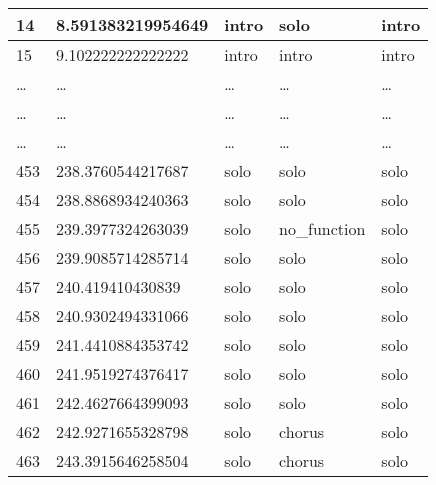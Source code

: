 \begin{table}[t]
\begin{tabular}{|l|l|l|l|l|}
    14            & 8.591383219954649  & intro               & solo                     & intro                   \\ \hline
    15            & 9.102222222222222  & intro               & intro                    & intro                   \\ \hline
    \dots         & \dots              & \dots               & \dots                    & \dots                   \\ \hline
    \dots         & \dots              & \dots               & \dots                    & \dots                   \\ \hline
    \dots         & \dots              & \dots               & \dots                    & \dots                   \\ \hline
    453           & 238.3760544217687  & solo                & solo                     & solo                    \\ \hline
    454           & 238.8868934240363  & solo                & solo                     & solo                    \\ \hline
    455           & 239.3977324263039  & solo                & no\_function             & solo                    \\ \hline
    456           & 239.9085714285714  & solo                & solo                     & solo                    \\ \hline
    457           & 240.419410430839   & solo                & solo                     & solo                    \\ \hline
    458           & 240.9302494331066  & solo                & solo                     & solo                    \\ \hline
    459           & 241.4410884353742  & solo                & solo                     & solo                    \\ \hline
    460           & 241.9519274376417  & solo                & solo                     & solo                    \\ \hline
    461           & 242.4627664399093  & solo                & solo                     & solo                    \\ \hline
    462           & 242.9271655328798  & solo                & chorus                   & solo                    \\ \hline
    463           & 243.3915646258504  & solo                & chorus                   & solo                    \\ \hline

\end{tabular}
\end{table}
